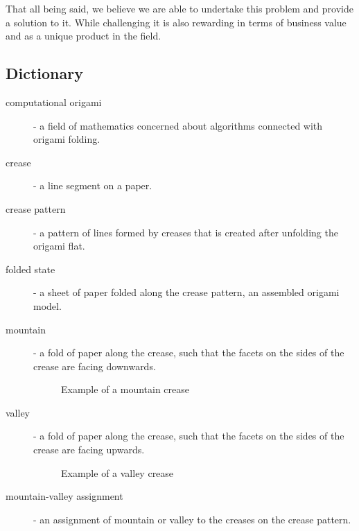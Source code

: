 That all being said, we believe we are able to undertake this problem and provide a solution to it.
While challenging it is also rewarding in terms of business value and as a unique product in the field.


\subsection{Dictionary} \label{dictionary}

\begin{description}
	\item[computational origami] \label{dictionary:computational-origami} - a field of mathematics concerned about algorithms connected with origami folding.
	\item[crease] - a line segment on a paper.
	\item[crease pattern] \label{dictionary:crease-pattern} - a pattern of lines formed by creases that is created after unfolding the origami flat.
	\item[folded state] \label{dictionary:folded-state} - a sheet of paper folded along the crease pattern, an assembled origami model.
	\item[mountain] - a fold of paper along the crease, such that the facets on the sides of the crease are facing downwards.
					\begin{figure}[H]
						\caption{Example of a mountain crease}
						\centering
					\end{figure}
	\item[valley] - a fold of paper along the crease, such that the facets on the sides of the crease are facing upwards.
					\begin{figure}[H]
						\caption{Example of a valley crease}
						\centering
					\end{figure}
	\item[mountain-valley assignment] - an assignment of mountain or valley to the creases on the crease pattern.
\end{description}


